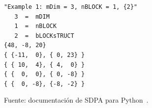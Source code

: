 \begin{table}[H]
\centering
\caption{Representación densa del ejemplo en formato SDPA.}
\label{tab:sdpa_format_example}
\begin{minipage}{0.72\textwidth}
\begin{verbatim}
"Example 1: mDim = 3, nBLOCK = 1, {2}"
   3  =  mDIM
   1  =  nBLOCK
   2  =  bLOCKsTRUCT
{48, -8, 20}
{ {-11,  0}, { 0, 23} }
{ { 10,  4}, { 4,  0} }
{ {  0,  0}, { 0, -8} }
{ {  0, -8}, {-8, -2} }
\end{verbatim}
\end{minipage}

\vspace{0.15cm}
{\footnotesize Fuente: documentación de SDPA para Python~\cite{SDPAFormat}.}
\end{table}
